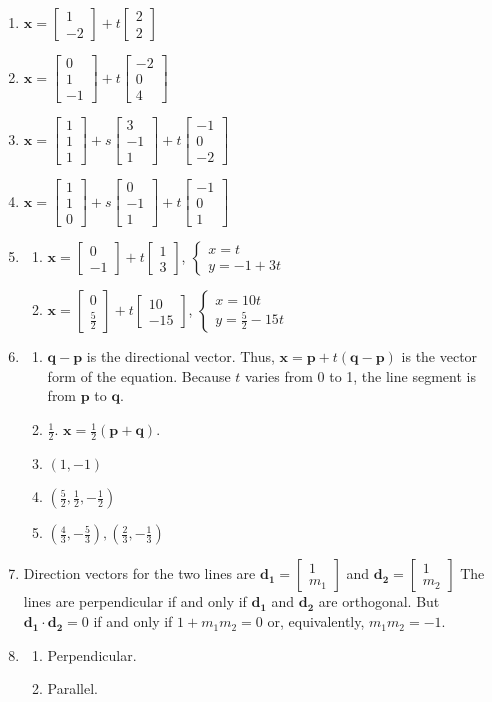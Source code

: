 \documentclass{article}
\newcommand{\vx}{\mathbf{x}}
\newcommand{\colvecTwo}[2]{
  \begin{bmatrix}
    #1 \\
    #2
  \end{bmatrix}
}
\newcommand{\colvecThree}[3]{
  \begin{bmatrix}
    #1 \\
    #2 \\
    #3
  \end{bmatrix}
}
\newcommand{\casesTwo}[2]{
  \begin{cases}
    #1 \\
    #2
  \end{cases}
}
\newcommand{\casesThree}[3]{
  \begin{cases}
    #1 \\
    #2 \\
    #3
  \end{cases}
}
\begin{document}
\begin{enumerate}
\begin{enumerate}
      \item $\vx=\colvecThree{6}{-4}{-3}+s\colvecThree{0}{1}{1}+t\colvecThree{-1}{1}{1}$
      \item $\casesThree{x=6-t}{y=-4+s+t}{z=-3+s+t}$
    \end{enumerate}
  \item $\vx=\colvecTwo{1}{-2}+t\colvecTwo{2}{2}$
  \item $\vx=\colvecThree{0}{1}{-1}+t\colvecThree{-2}{0}{4}$
  \item $\vx=\colvecThree{1}{1}{1}+s\colvecThree{3}{-1}{1}+t\colvecThree{-1}{0}{-2}$
  \item $\vx=\colvecThree{1}{1}{0}+s\colvecThree{0}{-1}{1}+t\colvecThree{-1}{0}{1}$
  \item
    \begin{enumerate}
      \item $\vx=\colvecTwo{0}{-1}+t\colvecTwo{1}{3}$, $\casesTwo{x=t}{y=-1+3t}$
      \item $\vx=\colvecTwo{0}{\frac{5}{2}}+t\colvecTwo{10}{-15}$,
        $\casesTwo{x=10t}{y=\frac{5}{2}-15t}$
    \end{enumerate}
  \item
    \begin{enumerate}
      \item $\mathbf{q}-\mathbf{p}$ is the directional vector. Thus, $\vx=\mathbf{p}+
        t(\mathbf{q}-\mathbf{p})$ is the vector form of the equation. Because $t$ varies
        from 0 to 1, the line segment is from $\mathbf{p}$ to $\mathbf{q}$.
      \item $\frac{1}{2}$. $\vx=\frac{1}{2}(\mathbf{p}+\mathbf{q})$.
      \item $(1, -1)$
      \item $(\frac{5}{2}, \frac{1}{2}, -\frac{1}{2})$
      \item $(\frac{4}{3}, -\frac{5}{3}), (\frac{2}{3}, -\frac{1}{3})$
    \end{enumerate}
  \item Direction vectors for the two lines are $\mathbf{d_1}=\colvecTwo{1}{m_1}$ and
    $\mathbf{d_2}=\colvecTwo{1}{m_2}$ The lines are perpendicular if and only if
    $\mathbf{d_1}$ and $\mathbf{d_2}$ are orthogonal. But $\mathbf{d_1}\cdot
    \mathbf{d_2}=0$ if and only if $1+m_1m_2=0$ or, equivalently, $m_1m_2=-1$.
  \item
    \begin{enumerate}
      \item Perpendicular.
      \item Parallel.

\end{enumerate}
\end{enumerate}
\end{document}
